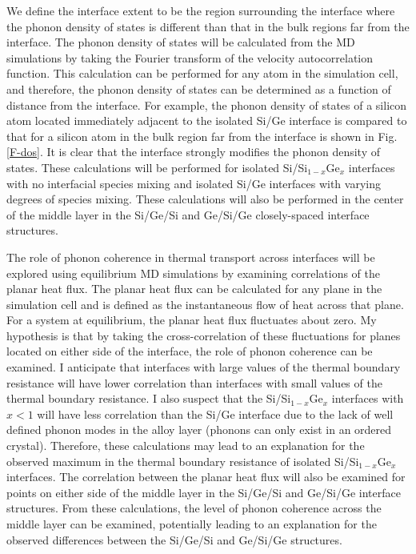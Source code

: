 \documentclass[letterpaper,12pt]{article}
\begin{document}

We define the interface extent to be the region surrounding the
interface where the phonon density of states is different than that
in the bulk regions far from the interface. The phonon density of
states will be calculated from the MD simulations by taking the
Fourier transform of the velocity autocorrelation function. This
calculation can be performed for any atom in the simulation cell,
and therefore, the phonon density of states can be determined as a
function of distance from the interface. For example, the phonon
density of states of a silicon atom located immediately adjacent to
the isolated Si/Ge interface is compared to that for a silicon atom
in the bulk region far from the interface is shown in Fig.
\ref{F-dos}. It is clear that the interface strongly modifies the
phonon density of states. These calculations will be performed for
isolated Si/Si$_{1-x}$Ge$_x$ interfaces with no interfacial species
mixing and isolated Si/Ge interfaces with varying degrees of species
mixing. These calculations will also be performed in the center of
the middle layer in the Si/Ge/Si and Ge/Si/Ge closely-spaced
interface structures.

The role of phonon coherence in thermal transport across interfaces
will be explored using equilibrium MD simulations by examining
correlations of the planar heat flux. The planar heat flux can be
calculated for any plane in the simulation cell and is defined as
the instantaneous flow of heat across that plane. For a system at
equilibrium, the planar heat flux fluctuates about zero. My
hypothesis is that by taking the cross-correlation of these
fluctuations for planes located on either side of the interface, the
role of phonon coherence can be examined. I anticipate that
interfaces with large values of the thermal boundary resistance will
have lower correlation than interfaces with small values of the
thermal boundary resistance. I also suspect that the
Si/Si$_{1-x}$Ge$_x$ interfaces with $x < 1$ will have less
correlation than the Si/Ge interface due to the lack of well defined
phonon modes in the alloy layer (phonons can only exist in an
ordered crystal). Therefore, these calculations may lead to an
explanation for the observed maximum in the thermal boundary
resistance of isolated Si/Si$_{1-x}$Ge$_x$ interfaces. The
correlation between the planar heat flux will also be examined for
points on either side of the middle layer in the Si/Ge/Si and
Ge/Si/Ge interface structures. From these calculations, the level of
phonon coherence across the middle layer can be examined,
potentially leading to an explanation for the observed differences
between the Si/Ge/Si and Ge/Si/Ge structures.
\end{document}
